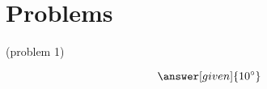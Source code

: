 \documentclass{ximera}
\begin{document}
\section{Problems}






\begin{problem}(problem 1)

\begin{hint}



\begin{center}

\end{center}

\end{hint}

\[
\answer[given]{10^\circ} 
\]

\end{problem}
\end{document}
